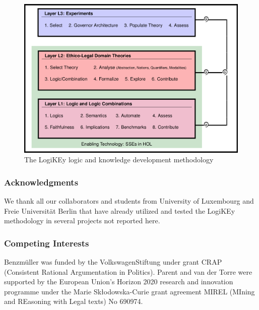 \documentclass{article}
\newcommand{\comment}[1]{
}
\begin{document}
\begin{figure}[ht!]
 \includegraphics[width=\textwidth]{LogiKEy-methodology.png}
\caption{The LogiKEy logic and knowledge development methodology \label{fig:LogiKEy}}
\end{figure}


\comment{
[Offer a complete description of the experimental design and methods used to acquire these data. Please provide any programs or code files used for filtering and analyzing these data. It is very important that this section is as comprehensive as possible and if you are submitting via another Elsevier journal you are encouraged to provide more detail than in your accompanying research article. There is no character limit for this section, however, no insight, interpretation, or background should be included in this section.]  
}


\subsubsection*{Acknowledgments} We thank all our collaborators and
students from University of Luxembourg and Freie Universität Berlin   
that have already utilized and tested the LogiKEy methodology in several
projects not reported here. 

\subsubsection*{Competing Interests}
Benzm\"uller was funded by the VolkswagenStiftung
  under grant CRAP (Consistent Rational Argumentation in
  Politics). Parent and van der Torre were supported by  the European
  Union's Horizon 2020 research and innovation programme under the
  Marie Sk\l{}odowska-Curie grant agreement MIREL (MIning and
  REasoning with Legal texts) No 690974.
\end{document}
